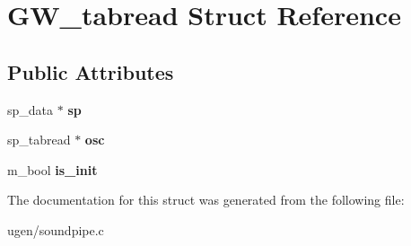 \hypertarget{structGW__tabread}{}\section{G\+W\+\_\+tabread Struct Reference}
\label{structGW__tabread}
\subsection*{Public Attributes}
\begin{DoxyCompactItemize}
\item 
\hypertarget{structGW__tabread_ae72c259f9a4e1fb691ecd9b4a89264fa}{}\label{structGW__tabread_ae72c259f9a4e1fb691ecd9b4a89264fa} 
sp\+\_\+data $\ast$ {\bfseries sp}
\item 
\hypertarget{structGW__tabread_a4cab1c834d41648cc3a658efded9c331}{}\label{structGW__tabread_a4cab1c834d41648cc3a658efded9c331} 
sp\+\_\+tabread $\ast$ {\bfseries osc}
\item 
\hypertarget{structGW__tabread_a447ee8ab6c74e29fec0f4d67ab966d63}{}\label{structGW__tabread_a447ee8ab6c74e29fec0f4d67ab966d63} 
m\+\_\+bool {\bfseries is\+\_\+init}
\end{DoxyCompactItemize}


The documentation for this struct was generated from the following file\+:\begin{DoxyCompactItemize}
\item 
ugen/soundpipe.\+c\end{DoxyCompactItemize}
